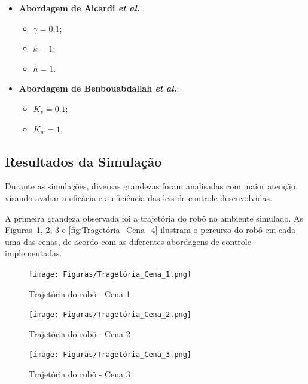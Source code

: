 \documentclass[conference]{IEEEtran}
\begin{document}
\begin{itemize}
    \item \textbf{Abordagem de Aicardi \textit{et al.}}:
    \begin{itemize}
        \item $\gamma = 0.1$;
        \item $k = 1$;
        \item $h = 1$.
    \end{itemize}
    
    \item \textbf{Abordagem de Benbouabdallah \textit{et al.}}:
    \begin{itemize}
        \item $K_v = 0.1$;
        \item $K_w = 1$.
    \end{itemize}
\end{itemize}

\subsection{Resultados da Simulação}

Durante as simulações, diversas grandezas foram analisadas com maior atenção, visando avaliar a eficácia e a eficiência das leis de controle desenvolvidas.

A primeira grandeza observada foi a trajetória do robô no ambiente simulado. As Figuras~\ref{fig:Tragetória_Cena_1}, \ref{fig:Tragetória_Cena_2}, \ref{fig:Tragetória_Cena_3} e \ref{fig:Tragetória_Cena_4} ilustram o percurso do robô em cada uma das cenas, de acordo com as diferentes abordagens de controle implementadas.

\begin{figure}[h!]
    \centering
    \texttt{[image: Figuras/Tragetória\_Cena\_1.png]}
    \caption{Trajetória do robô - Cena 1}
    \label{fig:Tragetória_Cena_1}
\end{figure}

\begin{figure}[h!]
    \centering
    \texttt{[image: Figuras/Tragetória\_Cena\_2.png]}
    \caption{Trajetória do robô - Cena 2}
    \label{fig:Tragetória_Cena_2}
\end{figure}

\begin{figure}[h!]
    \centering
    \texttt{[image: Figuras/Tragetória\_Cena\_3.png]}
    \caption{Trajetória do robô - Cena 3}
    \label{fig:Tragetória_Cena_3}
\end{figure}
\end{document}
